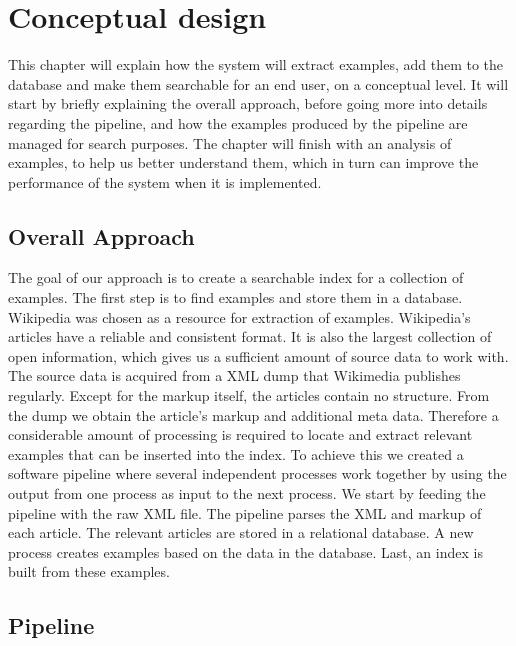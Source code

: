 
\chapter{Conceptual design}\label{cap_3}

This chapter will explain how the system will extract examples, add them to the database and make them searchable for an end user, on a conceptual level. It will start by briefly explaining the overall approach, before going more into details regarding the pipeline, and how the examples produced by the pipeline are managed for search purposes. The chapter will finish with an analysis of examples, to help us better understand them, which in turn can improve the performance of the system when it is implemented.

\section{Overall Approach}

The goal of our approach is to create a searchable index for a collection of examples. The first step is to find examples and store them in a database. Wikipedia was chosen as a resource for extraction of examples. Wikipedia's articles have a reliable and consistent format. It is also the largest collection of open information, which gives us a sufficient amount of source data to work with. The source data is acquired from a XML dump that Wikimedia publishes regularly. Except for the markup itself, the articles contain no structure. From the dump we obtain the article's markup and additional meta data. Therefore a considerable amount of processing is required to locate and extract relevant examples that can be inserted into the index. To achieve this we created a software pipeline where several independent processes work together by using the output from one process as input to the next process. We start by feeding the pipeline with the raw XML file. The pipeline parses the XML and markup of each article. The relevant articles are stored in a relational database. A new process creates examples based on the data in the database. Last, an index is built from these examples.

\section{Pipeline} \label{cd_pipeline}

